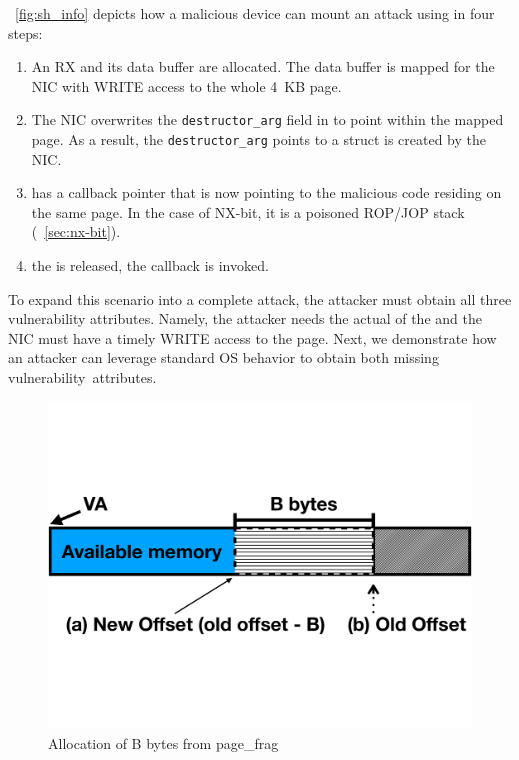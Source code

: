 \DIFdelbegin {}\DIFdelend \DIFaddbegin {}\DIFaddend ~\ref{fig:sh_info} depicts how a malicious device can mount an attack using \shinfo{} in four steps:
\begin{enumerate}[label=(\alph*)]
    \item An RX \skb{} and its data buffer are allocated. The data buffer is mapped for the NIC with WRITE access \DIFdelbegin {}\DIFdelend to the whole 4~KB page\DIFdelbegin \DIFdel{)}\DIFdelend . 
    \item The NIC overwrites the \texttt{destructor\_arg} field in \shinfo{} to point within the mapped page. As a result, the \texttt{destructor\_arg} points to a struct \uarg{} \DIFdelbegin {}\DIFdelend \DIFaddbegin {}\DIFaddend is created by the NIC.
    \item \uarg{} has a callback pointer that is now pointing to the malicious code residing on the same page. In the case of NX-bit, it is a poisoned ROP/JOP\cite{BJFL11} stack (\DIFdelbegin {}\DIFdelend \DIFaddbegin {}\DIFaddend ~\ref{sec:nx-bit}).
    \item \DIFdelbegin {}\DIFdelend \DIFaddbegin {}\DIFaddend the \skb{} is released, the callback is invoked.
\end{enumerate}
To expand this scenario into a complete attack, the attacker must obtain all three vulnerability attributes. Namely, the attacker needs the actual \kva{} of the \mabaf{} and the NIC must have a timely \DIFaddbegin {}\DIFaddend WRITE access to the page. Next, we demonstrate how an attacker can leverage standard OS behavior to obtain both missing \mbox{vulnerability attributes.}

\begin{figure}[t]
    \centering
    \includegraphics[width=0.65\linewidth,trim=0 6cm 0 6cm, clip]{figs/page_frag.pdf}
    \caption{Allocation of B bytes from page\_frag}
    \label{fig:page_frags}
\end{figure}

